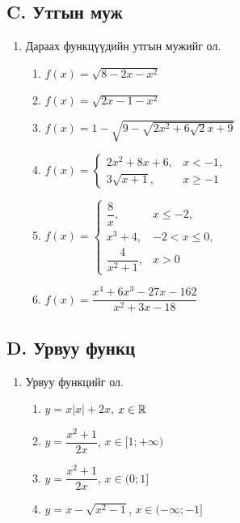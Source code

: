 \subsection*{C. Утгын муж}
\begin{enumerate}[resume]
\item Дараах функцүүдийн утгын мужийг ол.
\begin{enumerate}
  \item $f(x)=\sqrt{8-2x-x^2}$
  \item $f(x)=\sqrt{2x-1-x^2}$
  \item $f(x)=1-\sqrt{9-\sqrt{2x^2+6\sqrt2x+9}}$
  \item $f(x)=\begin{cases}2x^2+8x+6, & x<-1,\\ 3\sqrt{x+1}, & x\ge-1\end{cases}$
  \item $f(x)=\begin{cases}\dfrac8x, & x\le-2,\\ x^3+4, & -2<x\le0,\\ \dfrac{4}{x^2+1}, & x>0\end{cases}$
  \item $f(x)=\dfrac{x^4+6x^3-27x-162}{x^2+3x-18}$
\end{enumerate}
\end{enumerate}

\subsection*{D. Урвуу функц}
\begin{enumerate}[resume]
\item Урвуу функцийг ол.
\begin{enumerate}
  \item $y=x|x|+2x$, \; $x\in\mathbb{R}$
  \item $y=\dfrac{x^2+1}{2x}$, \; $x\in[1;+\infty)$
  \item $y=\dfrac{x^2+1}{2x}$, \; $x\in(0;1]$
  \item $y=x-\sqrt{x^2-1}$, \; $x\in(-\infty;-1]$
\end{enumerate}
\end{enumerate}

